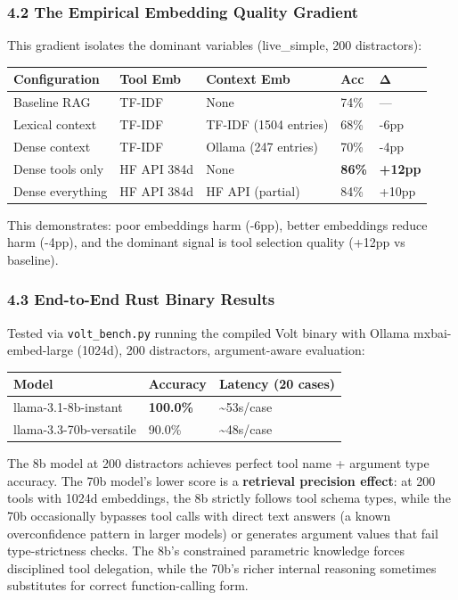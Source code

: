 \documentclass[
  10pt,
]{article}
\begin{document}
\subsubsection{4.2 The Empirical Embedding Quality
Gradient}\label{the-empirical-embedding-quality-gradient}

This gradient isolates the dominant variables (live\_simple, 200
distractors):

\begin{longtable}[]{@{}lllll@{}}
\toprule\noalign{}
Configuration & Tool Emb & Context Emb & Acc & Δ \\
\midrule\noalign{}
\endhead
\bottomrule\noalign{}
\endlastfoot
Baseline RAG & TF-IDF & None & 74\% & --- \\
Lexical context & TF-IDF & TF-IDF (1504 entries) & 68\% & -6pp \\
Dense context & TF-IDF & Ollama (247 entries) & 70\% & -4pp \\
Dense tools only & HF API 384d & None & \textbf{86\%} &
\textbf{+12pp} \\
Dense everything & HF API 384d & HF API (partial) & 84\% & +10pp \\
\end{longtable}

This demonstrates: poor embeddings harm (-6pp), better embeddings reduce
harm (-4pp), and the dominant signal is tool selection quality (+12pp vs
baseline).

\subsubsection{4.3 End-to-End Rust Binary
Results}\label{end-to-end-rust-binary-results}

Tested via \texttt{volt\_bench.py} running the compiled Volt binary with
Ollama mxbai-embed-large (1024d), 200 distractors, argument-aware
evaluation:

\begin{longtable}[]{@{}lll@{}}
\toprule\noalign{}
Model & Accuracy & Latency (20 cases) \\
\midrule\noalign{}
\endhead
\bottomrule\noalign{}
\endlastfoot
llama-3.1-8b-instant & \textbf{100.0\%} & \textasciitilde53s/case \\
llama-3.3-70b-versatile & 90.0\% & \textasciitilde48s/case \\
\end{longtable}

The 8b model at 200 distractors achieves perfect tool name + argument
type accuracy. The 70b model's lower score is a \textbf{retrieval
precision effect}: at 200 tools with 1024d embeddings, the 8b strictly
follows tool schema types, while the 70b occasionally bypasses tool
calls with direct text answers (a known overconfidence pattern in larger
models) or generates argument values that fail type-strictness checks.
The 8b's constrained parametric knowledge forces disciplined tool
delegation, while the 70b's richer internal reasoning sometimes
substitutes for correct function-calling form.
\end{document}
